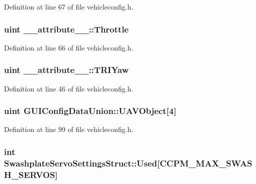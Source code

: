 \-Definition at line 67 of file vehicleconfig.\-h.

\hypertarget{group___config_plugin_ga5045493288e2ee044c68dafe0a02b05c}{
\subsubsection[{\-Throttle}]{\setlength{\rightskip}{0pt plus 5cm}uint {\bf \-\_\-\-\_\-attribute\-\_\-\-\_\-\-::\-Throttle}}}\label{group___config_plugin_ga5045493288e2ee044c68dafe0a02b05c}


\-Definition at line 66 of file vehicleconfig.\-h.

\hypertarget{group___config_plugin_ga63632c414ddd0db93282a775cff6ee2b}{
\subsubsection[{\-T\-R\-I\-Yaw}]{\setlength{\rightskip}{0pt plus 5cm}uint {\bf \-\_\-\-\_\-attribute\-\_\-\-\_\-\-::\-T\-R\-I\-Yaw}}}\label{group___config_plugin_ga63632c414ddd0db93282a775cff6ee2b}


\-Definition at line 46 of file vehicleconfig.\-h.

\hypertarget{group___config_plugin_ga1a1fbf9187086cc92fac84f33f19402f}{
\subsubsection[{\-U\-A\-V\-Object}]{\setlength{\rightskip}{0pt plus 5cm}uint {\bf \-G\-U\-I\-Config\-Data\-Union\-::\-U\-A\-V\-Object}\mbox{[}4\mbox{]}}}\label{group___config_plugin_ga1a1fbf9187086cc92fac84f33f19402f}


\-Definition at line 99 of file vehicleconfig.\-h.

\hypertarget{group___config_plugin_ga9fda1ee21effccd7fcbad04816734eac}{
\subsubsection[{\-Used}]{\setlength{\rightskip}{0pt plus 5cm}int {\bf \-Swashplate\-Servo\-Settings\-Struct\-::\-Used}\mbox{[}\-C\-C\-P\-M\-\_\-\-M\-A\-X\-\_\-\-S\-W\-A\-S\-H\-\_\-\-S\-E\-R\-V\-O\-S\mbox{]}}}\label{group___config_plugin_ga9fda1ee21effccd7fcbad04816734eac}


